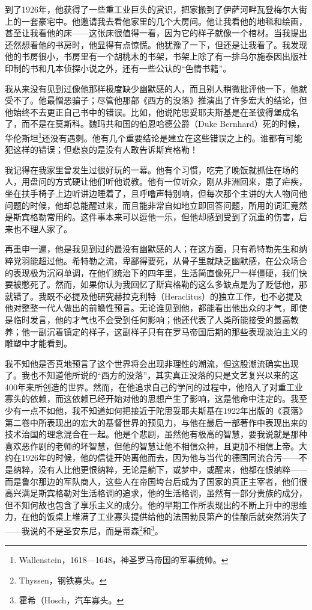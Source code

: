 \documentclass[UTF8]{ctexart}
\begin{document}
到了1926年，他获得了一些重工业巨头的赏识，把家搬到了伊萨河畔瓦登梅尔大街上的一套豪宅中。他邀请我去看他家里的几个大房间。他让我看他的地毯和绘画，甚至让我看他的床——这张床很值得一看，因为它的样子就像一个棺材。当我提出还然想看他的书房时，他显得有点惊慌。他犹豫了一下，但还是让我看了。我发现他的书房很小，书房里有一个胡桃木的书架，书架上除了有一排乌尔施泰因出版社印制的书和几本侦探小说之外，还有一些公认的“色情书籍”。

我从来没有见到过像他那样极度缺少幽默感的人，而且别人稍微批评他一下，他就受不了。他最憎恶骗子；尽管他那部《西方的没落》推演出了许多宏大的结论，但他始终不去更正自己书中的错误。比如，他说陀思妥耶夫斯基是在圣彼得堡成名了，而不是在莫斯科。魏玛共和国的伯恩哈德公爵（Duke Bernhard）死的时候，华伦斯坦\footnote{Wallenstein，1618—1648，神圣罗马帝国的军事统帅。}还没有遇刺。他有几个重要结论是建立在这些错误之上的。谁都有可能犯这样的错误；但悲哀的是没有人敢告诉斯宾格勒！

我记得在我家里曾发生过很好玩的一幕。他有个习惯，吃完了晚饭就抓住在场的人，用盘问的方式硬让他们听他说教。他有一位听众，刚从非洲回来，患了疟疾，坐在扶手椅子上边听讲边睡着了，且呼噜声特别响，但每次那个主讲的大人物问他问题的时候，他却总能醒过来，而且能非常自如地立即回答问题，所用的词汇竟然是斯宾格勒常用的。这件事本来可以逗他一乐，但他却感到受到了沉重的伤害，后来也不理人家了。

再重申一遍，他是我见到过的最没有幽默感的人；在这方面，只有希特勒先生和纳粹党羽能超过他。希特勒之流，卑鄙得要死，从骨子里就缺乏幽默感，在公众场合的表现极为沉闷单调，在他们统治下的四年里，生活简直像死尸一样僵硬，我们快要被憋死了。然而，如果你认为我回忆了斯宾格勒的这么多缺点是为了贬低他，那就错了。我既不必提及他研究赫拉克利特（Heraclitus）的独立工作，也不必提及他对整整一代人做出的前瞻性预言。无论谁见到他，都能看出他出众的才气，即使是临时发言，他的才气也不会受到任何影响；他还代表了人类所能接受的最高教养；他一副沉着镇定的样子，这副样子只有在罗马帝国后期的那些表现淡泊主义的雕塑中才能看到。

我不知他是否真地预言了这个世界将会出现非理性的潮流，但这股潮流确实出现了。我也不知道他所说的“西方的没落”，其实真正没落的只是文艺复兴以来的这400年来所创造的世界。然而，在他追求自己的学问的过程中，他陷入了对重工业寡头的依赖，而这依赖已经开始对他的思想产生了影响，这是他命中注定的。我至少有一点不如他，我不知道如何把接近于陀思妥耶夫斯基在1922年出版的《衰落》第二卷中所表现出的宏大的基督世界的预见力，与他在最后一部著作中表现出来的技术治国的理念混合在一起。他是个悲剧，虽然他有极高的智慧，要我说就是那种喜欢恶作剧的老师的坏智慧，但他的智慧让他不相信众神，且更加不相信上帝。大约在1926年的时候，他的信徒开始离他而去，因为他与当代的德国同流合污——不是纳粹，没有人比他更恨纳粹，无论是躺下，或梦中，或醒来，他都在恨纳粹——而是鲁尔那边的军队商人，这些人在帝国垮台后成为了国家的真正主宰者，他们很高兴满足斯宾格勒对生活格调的追求，他的生活格调，虽然有一部分贵族的成分，但不知何故也包含了享乐主义的成分。他的早期工作所表现出的不断上升中的思维力，在他的饭桌上堆满了工业寡头提供给他的法国勃艮第产的佳酿后就突然消失了——我说的不是圣安东尼，而是蒂森\footnote{Thyssen，钢铁寡头。}和\footnote{霍希（Hosch，汽车寡头。}。
\end{document}
